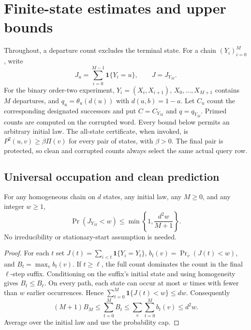 \section{Finite-state estimates and upper bounds}
\label{sec:positive-proofs}

Throughout, a departure count excludes the terminal state.  For a chain
$(Y_i)_{i=0}^M$, write
\[
 J_u=\sum_{i=0}^{M-1}\mathbf1\{Y_i=u\},\qquad J=J_{Y_M}.
\]
For the binary order-two experiment, $Y_i=(X_i,X_{i+1})$,
$X_0,\ldots,X_{M+1}$ contains $M$ departures, and
$q_u=\theta_u(d(u))$ with $d(a,b)=1-a$.  Let $C_u$ count the
corresponding designated successors and put $C=C_{Y_M}$ and $q=q_{Y_M}$.
Primed counts are computed on the corrupted word.  Every bound below permits
an arbitrary initial law.  The all-state certificate, when invoked, is
$P^2(u,v)\ge\beta\Pi(v)$ for every pair of states, with $\beta>0$.
The final pair is protected, so clean and corrupted counts always select the
same actual query row.

\subsection{Universal occupation and clean prediction}

\begin{lemma}\label{lem:occupation}
For any homogeneous chain on $d$ states, any initial law, any $M\ge0$, and
any integer $w\ge1$,
\[
 \Pr(J_{Y_M}<w)\le\min\left\{1,\frac{d^2w}{M+1}\right\}.
\]
No irreducibility or stationary-start assumption is needed.
\end{lemma}
\begin{proof}
For each $t$ set $J(t)=\sum_{i<t}\mathbf1\{Y_i=Y_t\}$,
$b_t(v)=\Pr_v(J(t)<w)$, and $B_t=\max_v b_t(v)$.  If $t\ge\ell$,
the full count dominates the count in the final $\ell$-step suffix.
Conditioning on the suffix's initial state and using homogeneity gives
$B_t\le B_\ell$.  On every path, each state can occur at most $w$ times
with fewer than $w$ earlier occurrences.  Hence
$\sum_{t=0}^M\mathbf1\{J(t)<w\}\le dw$.  Consequently
\[
 (M+1)B_M\le\sum_{t=0}^M B_t
 \le\sum_v\sum_{t=0}^M b_t(v)\le d^2w.
\]
Average over the initial law and use the probability cap.
\end{proof}


